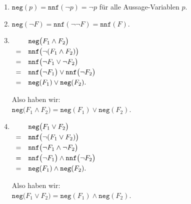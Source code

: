 \begin{enumerate}
\item $\texttt{neg}(p) = \texttt{nnf}(\neg p) = \neg p$ für alle Aussage-Variablen $p$.
\item $\texttt{neg}(\neg F) = \texttt{nnf}(\neg \neg F) = \texttt{nnf}(F)$.
\item $\begin{array}[t]{cl}
         & \texttt{neg}\bigl(F_1 \wedge F_2 \bigr) \\[0.1cm]
       = & \texttt{nnf}\bigl(\neg(F_1 \wedge F_2)\bigr) \\[0.1cm]
       = & \texttt{nnf}\bigl(\neg F_1 \vee \neg F_2\bigr) \\[0.1cm]
       = & \texttt{nnf}\bigl(\neg F_1\bigr) \vee \texttt{nnf}\bigl(\neg F_2\bigr) \\[0.1cm]
       = & \texttt{neg}(F_1) \vee \texttt{neg}(F_2).
       \end{array}
      $

      Also haben wir:
      \\[0.2cm]
      \hspace*{1.3cm}
      $\texttt{neg}\bigl(F_1 \wedge F_2 \bigr) = \texttt{neg}(F_1) \vee \texttt{neg}(F_2)$.
\item $\begin{array}[t]{cl}
         & \texttt{neg}\bigl(F_1 \vee F_2 \bigr)        \\[0.1cm]
       = & \texttt{nnf}\bigl(\neg(F_1 \vee F_2) \bigr)  \\[0.1cm]
       = & \texttt{nnf}\bigl(\neg F_1 \wedge \neg F_2 \bigr)  \\[0.1cm]
       = & \texttt{nnf}\bigl(\neg F_1\bigr) \wedge \texttt{nnf}\bigl(\neg F_2 \bigr)  \\[0.1cm]
       = & \texttt{neg}(F_1) \wedge \texttt{neg}(F_2). 
       \end{array}
      $

      Also haben wir: 
      \\[0.2cm]
      \hspace*{1.3cm}
      $\texttt{neg}\bigl(F_1 \vee F_2 \bigr) = \texttt{neg}(F_1) \wedge \texttt{neg}(F_2)$.
\end{enumerate}

